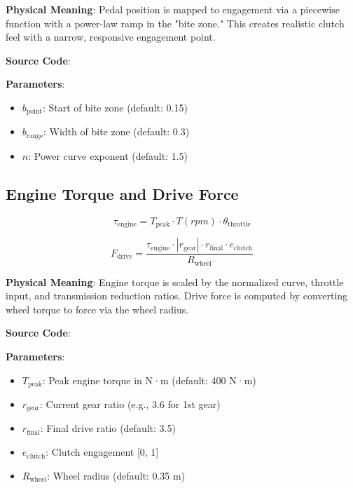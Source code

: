 \textbf{Physical Meaning}: Pedal position is mapped to engagement via a piecewise function with a power-law ramp in the "bite zone." This creates realistic clutch feel with a narrow, responsive engagement point.

\textbf{Source Code}: 

\textbf{Parameters}:
\begin{itemize}
  \item $b_{\text{point}}$: Start of bite zone (default: 0.15)
  \item $b_{\text{range}}$: Width of bite zone (default: 0.3)
  \item $n$: Power curve exponent (default: 1.5)
\end{itemize}

\subsection{Engine Torque and Drive Force}

\begin{equation}
  \tau_{\text{engine}} = T_{\text{peak}} \cdot T(rpm) \cdot \theta_{\text{throttle}}
  \label{eq:engine-torque}
\end{equation}

\begin{equation}
  F_{\text{drive}} = \frac{\tau_{\text{engine}} \cdot |r_{\text{gear}}| \cdot r_{\text{final}} \cdot e_{\text{clutch}}}{R_{\text{wheel}}}
  \label{eq:drive-force}
\end{equation}

\textbf{Physical Meaning}: Engine torque is scaled by the normalized curve, throttle input, and transmission reduction ratios. Drive force is computed by converting wheel torque to force via the wheel radius.

\textbf{Source Code}: 

\textbf{Parameters}:
\begin{itemize}
  \item $T_{\text{peak}}$: Peak engine torque in N·m (default: 400 N·m)
  \item $r_{\text{gear}}$: Current gear ratio (e.g., 3.6 for 1st gear)
  \item $r_{\text{final}}$: Final drive ratio (default: 3.5)
  \item $e_{\text{clutch}}$: Clutch engagement [0, 1]
  \item $R_{\text{wheel}}$: Wheel radius (default: 0.35 m)
\end{itemize}

